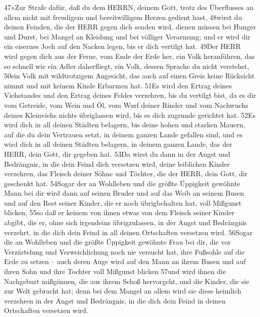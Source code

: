 47»Zur Strafe dafür, daß du dem HERRN, deinem Gott, trotz des
Überflusses an allem nicht mit freudigem und bereitwilligem Herzen
gedient hast, 48wirst du deinen Feinden, die der HERR gegen dich senden
wird, dienen müssen bei Hunger und Durst, bei Mangel an Kleidung und bei
völliger Verarmung; und er wird dir ein eisernes Joch auf den Nacken
legen, bis er dich vertilgt hat. 49Der HERR wird gegen dich aus der
Ferne, vom Ende der Erde her, ein Volk heranführen, das so schnell wie
ein Adler daherfliegt, ein Volk, dessen Sprache du nicht verstehst,
50ein Volk mit wildtrotzigem Angesicht, das auch auf einen Greis keine
Rücksicht nimmt und mit keinem Kinde Erbarmen hat. 51Es wird den Ertrag
deines Viehstandes und den Ertrag deines Feldes verzehren, bis du
vertilgt bist, da es dir vom Getreide, vom Wein und Öl, vom Wurf deiner
Rinder und vom Nachwuchs deines Kleinviehs nichts übriglassen wird, bis
es dich zugrunde gerichtet hat. 52Es wird dich in all deinen Städten
belagern, bis deine hohen und starken Mauern, auf die du dein Vertrauen
setzt, in deinem ganzen Lande gefallen sind, und es wird dich in all
deinen Städten belagern, in deinem ganzen Lande, das der HERR, dein
Gott, dir gegeben hat. 53Da wirst du dann in der Angst und Bedrängnis,
in die dein Feind dich versetzen wird, deine leiblichen Kinder
verzehren, das Fleisch deiner Söhne und Töchter, die der HERR, dein
Gott, dir geschenkt hat. 54Sogar der an Wohlleben und die größte
Üppigkeit gewöhnte Mann bei dir wird dann auf seinen Bruder und auf das
Weib an seinem Busen und auf den Rest seiner Kinder, die er noch
übrigbehalten hat, voll Mißgunst blicken, 55so daß er keinem von ihnen
etwas von dem Fleisch seiner Kinder abgibt, die er, ohne sich irgendeins
übrigzulassen, in der Angst und Bedrängnis verzehrt, in die dich dein
Feind in all deinen Ortschaften versetzen wird. 56Sogar die an Wohlleben
und die größte Üppigkeit gewöhnte Frau bei dir, die vor Verzärtelung und
Verweichlichung noch nie versucht hat, ihre Fußsohle auf die Erde zu
setzen -- auch deren Auge wird auf den Mann an ihrem Busen und auf ihren
Sohn und ihre Tochter voll Mißgunst blicken 57und wird ihnen die
Nachgeburt mißgönnen, die aus ihrem Schoß hervorgeht, und die Kinder,
die sie zur Welt gebracht hat; denn bei dem Mangel an allem wird sie
diese heimlich verzehren in der Angst und Bedrängnis, in die dich dein
Feind in deinen Ortschaften versetzen wird.

